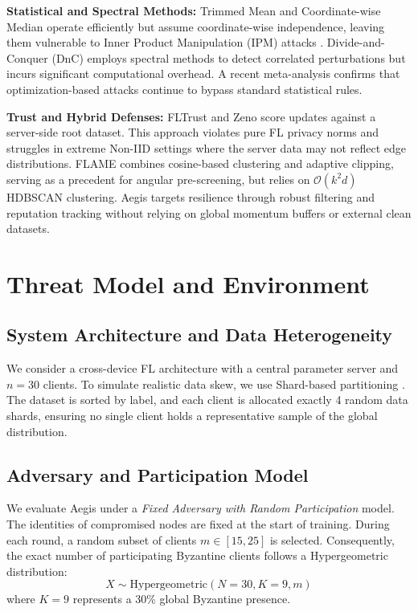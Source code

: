 \documentclass[10pt, conference]{IEEEtran}
\begin{document}
\textbf{Statistical and Spectral Methods:} Trimmed Mean and Coordinate-wise Median \cite{yin2018} operate efficiently but assume coordinate-wise independence, leaving them vulnerable to Inner Product Manipulation (IPM) attacks \cite{xie2020ipm}. Divide-and-Conquer (DnC) \cite{shejwalkar2021} employs spectral methods to detect correlated perturbations but incurs significant computational overhead. A recent meta-analysis \cite{allouah2025} confirms that optimization-based attacks continue to bypass standard statistical rules.

\textbf{Trust and Hybrid Defenses:} FLTrust \cite{cao2021} and Zeno \cite{xie2019zeno} score updates against a server-side root dataset. This approach violates pure FL privacy norms and struggles in extreme Non-IID settings where the server data may not reflect edge distributions. FLAME \cite{nguyen2022} combines cosine-based clustering and adaptive clipping, serving as a precedent for angular pre-screening, but relies on $\mathcal{O}(k^2 d)$ HDBSCAN clustering. Aegis targets resilience through robust filtering and reputation tracking without relying on global momentum buffers or external clean datasets.

\section{Threat Model and Environment}

\subsection{System Architecture and Data Heterogeneity}
We consider a cross-device FL architecture with a central parameter server and $n = 30$ clients. To simulate realistic data skew, we use Shard-based partitioning \cite{mcmahan2017}. The dataset is sorted by label, and each client is allocated exactly 4 random data shards, ensuring no single client holds a representative sample of the global distribution.

\subsection{Adversary and Participation Model}
We evaluate Aegis under a \textit{Fixed Adversary with Random Participation} model. The identities of compromised nodes are fixed at the start of training. During each round, a random subset of clients $m \in [15, 25]$ is selected. Consequently, the exact number of participating Byzantine clients follows a Hypergeometric distribution:
\begin{equation}
X \sim \text{Hypergeometric}(N=30, K=9, m)
\end{equation}
where $K=9$ represents a 30\% global Byzantine presence. 
\end{document}
